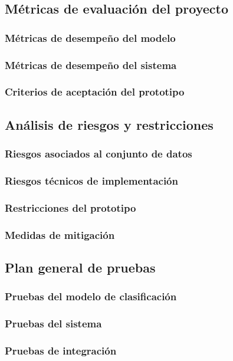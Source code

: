 \subsection{Métricas de evaluación del proyecto}
\subsubsection{Métricas de desempeño del modelo}
\subsubsection{Métricas de desempeño del sistema}
\subsubsection{Criterios de aceptación del prototipo}

\subsection{Análisis de riesgos y restricciones}
\subsubsection{Riesgos asociados al conjunto de datos}
\subsubsection{Riesgos técnicos de implementación}
\subsubsection{Restricciones del prototipo}

\newpage
\subsubsection{Medidas de mitigación}

\subsection{Plan general de pruebas}
\subsubsection{Pruebas del modelo de clasificación}
\subsubsection{Pruebas del sistema}
\subsubsection{Pruebas de integración}
